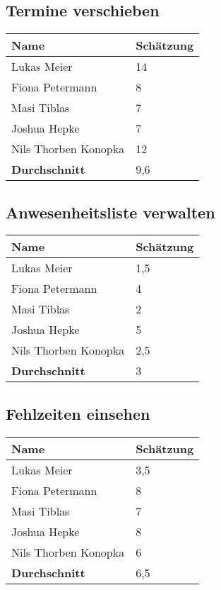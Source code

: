 \newpage

\subsection{Termine verschieben}
\begin{tabular} {|p{5cm}|p{}|}
	\hline
	Name & Schätzung \\
	\hline
	Lukas Meier 
	& 14 \\
	\hline
	Fiona Petermann 
	& 8 \\
	\hline
	Masi Tiblas 
	& 7 \\
	\hline
	Joshua Hepke
	& 7 \\
	\hline
	Nils Thorben Konopka
	& 12 \\
	\hline \hline
	\textbf{Durchschnitt}
	& 9,6 \\
	\hline
\end{tabular}

\newpage

\subsection{Anwesenheitsliste verwalten}
\begin{tabular} {|p{5cm}|p{}|}
	\hline
	Name & Schätzung \\
	\hline
	Lukas Meier 
	& 1,5 \\
	\hline
	Fiona Petermann 
	& 4 \\
	\hline
	Masi Tiblas 
	& 2 \\
	\hline
	Joshua Hepke
	& 5 \\
	\hline
	Nils Thorben Konopka
	& 2,5 \\
	\hline \hline
	\textbf{Durchschnitt}
	& 3 \\
	\hline
\end{tabular}

\newpage

\subsection{Fehlzeiten einsehen}
\begin{tabular} {|p{5cm}|p{}|}
	\hline
	Name & Schätzung \\
	\hline
	Lukas Meier 
	& 3,5 \\
	\hline
	Fiona Petermann 
	& 8 \\
	\hline
	Masi Tiblas 
	& 7 \\
	\hline
	Joshua Hepke
	& 8 \\
	\hline
	Nils Thorben Konopka
	& 6 \\
	\hline \hline
	\textbf{Durchschnitt}
	& 6,5 \\
	\hline
\end{tabular}

